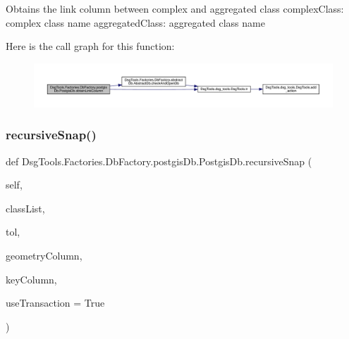 \begin{DoxyVerb}Obtains the link column between complex and aggregated class
complexClass: complex class name
aggregatedClass: aggregated class name
\end{DoxyVerb}
 Here is the call graph for this function\+:
\nopagebreak
\begin{figure}[H]
\begin{center}
\leavevmode
\includegraphics[width=350pt]{class_dsg_tools_1_1_factories_1_1_db_factory_1_1postgis_db_1_1_postgis_db_af56a40cf1c4ffa7d251cf7bba5618af5_cgraph}
\end{center}
\end{figure}
\mbox{\label{class_dsg_tools_1_1_factories_1_1_db_factory_1_1postgis_db_1_1_postgis_db_a378ae922a6592089abe153fb9fcd52ec}} 
\subsubsection{\texorpdfstring{recursive\+Snap()}{recursiveSnap()}}
{\footnotesize\ttfamily def Dsg\+Tools.\+Factories.\+Db\+Factory.\+postgis\+Db.\+Postgis\+Db.\+recursive\+Snap (\begin{DoxyParamCaption}\item[{}]{self,  }\item[{}]{class\+List,  }\item[{}]{tol,  }\item[{}]{geometry\+Column,  }\item[{}]{key\+Column,  }\item[{}]{use\+Transaction = {\ttfamily True} }\end{DoxyParamCaption})}

